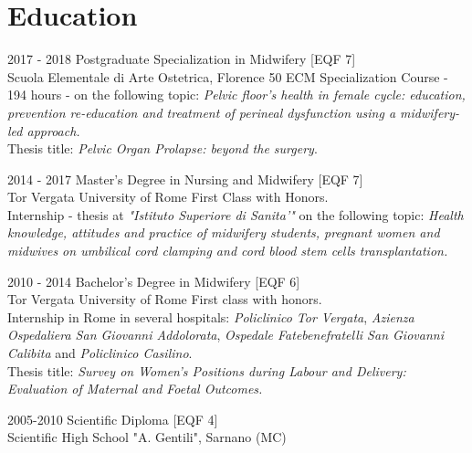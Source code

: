 \documentclass[11pt]{friggeri-cv}
\begin{document}
\section{Education}
\begin{entrylist}
  \entry
  {2017 - 2018}
  {Postgraduate Specialization in Midwifery [\small EQF 7]}
  {\\Scuola Elementale di Arte Ostetrica, Florence}
  {50 ECM Specialization Course - 194 hours - on the following topic: 
  \emph{Pelvic floor's health in female cycle: education, prevention 
  re-education and treatment of perineal dysfunction using a midwifery-led 
  approach.}\\
  Thesis title: \emph{Pelvic Organ Prolapse: beyond the surgery}.\\}
  
  \entry
  {2014 - 2017}
  {Master's Degree in Nursing and Midwifery [\small EQF 7]}
  {\\Tor Vergata University of Rome}
  {First Class with Honors. \\Internship - thesis at \textit{"Istituto 
  Superiore di Sanita'"} on the following topic: \textit{Health knowledge, 
  attitudes and practice of midwifery students, pregnant women and midwives on 
  umbilical cord clamping and cord blood stem cells transplantation.}\\}
  
  \entry
  {2010 - 2014}
  {Bachelor's Degree in Midwifery [\small EQF 6]}
  {\\Tor Vergata University of Rome}
  {First class with honors.\\
  Internship in Rome in several hospitals: \textit{Policlinico Tor Vergata}, 
  \textit{Azienza Ospedaliera San Giovanni Addolorata}, \textit{Ospedale 
  Fatebenefratelli San Giovanni Calibita} and \textit{Policlinico Casilino}.\\
  Thesis title: \textit{Survey on Women's Positions during Labour and Delivery: 
  Evaluation of Maternal and Foetal Outcomes.}\\}
  
  \entry
  {2005-2010}
  {Scientific Diploma [\small EQF 4]}
  {\\Scientific High School "A. Gentili", Sarnano (MC)}
  {}
\end{entrylist}

\vspace{-20pt}
\end{document}
